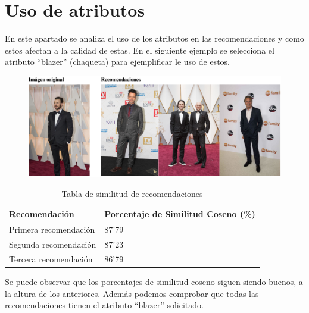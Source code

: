 \documentclass[12pt]{report} %
\begin{document}
	\section{Uso de atributos}

	En este apartado se analiza el uso de los atributos en las recomendaciones y como estos afectan a la calidad
	de estas. En el siguiente ejemplo se selecciona el atributo ``blazer'' (chaqueta) para ejemplificar le uso de estos.
	\begin{figure}[H]
		{\includegraphics[scale=0.6]{atributos1.png}}
	\end{figure}
	\begin{table}[H]
		\centering
		\caption{Tabla de similitud de recomendaciones}
		\begin{tabular}{ll}
				\textbf{Recomendación} & \textbf{Porcentaje de Similitud Coseno (\%)} \\
				\midrule
				Primera recomendación & 87'79 \\
				Segunda recomendación & 87'23 \\
				Tercera recomendación & 86'79 \\
				\bottomrule
		\end{tabular}
	\end{table}
	
	Se puede observar que los porcentajes de similitud coseno siguen siendo buenos, a la altura de los anteriores. Además 
	podemos comprobar que todas las recomendaciones tienen el atributo ``blazer'' solicitado. 
	
\end{document}
